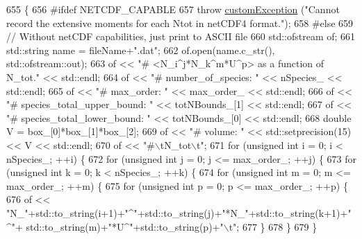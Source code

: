 \begin{DoxyCode}
655                                                                                \{
656 \textcolor{preprocessor}{#ifdef NETCDF\_CAPABLE}
657 \textcolor{preprocessor}{}    \textcolor{keywordflow}{throw} \hyperlink{classcustom_exception}{customException} (\textcolor{stringliteral}{"Cannot record the extensive moments for each Ntot in netCDF4
       format."});
658 \textcolor{preprocessor}{#else}
659 \textcolor{preprocessor}{}    \textcolor{comment}{// Without netCDF capabilities, just print to ASCII file}
660     std::ofstream of;
661     std::string name = fileName+\textcolor{stringliteral}{".dat"};
662     of.open(name.c\_str(), std::ofstream::out);
663     of << \textcolor{stringliteral}{"# <N\_i^j*N\_k^m*U^p> as a function of N\_tot."} << std::endl;
664     of << \textcolor{stringliteral}{"# number\_of\_species: "} << nSpecies\_ << std::endl;
665     of << \textcolor{stringliteral}{"# max\_order: "} << max\_order\_ << std::endl;
666     of << \textcolor{stringliteral}{"# species\_total\_upper\_bound: "} << totNBounds\_[1] << std::endl;
667     of << \textcolor{stringliteral}{"# species\_total\_lower\_bound: "} << totNBounds\_[0] << std::endl;
668     \textcolor{keywordtype}{double} V = box\_[0]*box\_[1]*box\_[2];
669     of << \textcolor{stringliteral}{"# volume: "} << std::setprecision(15) << V << std::endl;
670     of << \textcolor{stringliteral}{"#\(\backslash\)tN\_tot\(\backslash\)t"};
671     \textcolor{keywordflow}{for} (\textcolor{keywordtype}{unsigned} \textcolor{keywordtype}{int} i = 0; i < nSpecies\_; ++i) \{
672         \textcolor{keywordflow}{for} (\textcolor{keywordtype}{unsigned} \textcolor{keywordtype}{int} j = 0; j <= max\_order\_; ++j) \{
673             \textcolor{keywordflow}{for} (\textcolor{keywordtype}{unsigned} \textcolor{keywordtype}{int} k = 0; k < nSpecies\_; ++k) \{
674                 \textcolor{keywordflow}{for} (\textcolor{keywordtype}{unsigned} \textcolor{keywordtype}{int} m = 0; m <= max\_order\_; ++m) \{
675                     \textcolor{keywordflow}{for} (\textcolor{keywordtype}{unsigned} \textcolor{keywordtype}{int} p = 0; p <= max\_order\_; ++p) \{
676                         of << \textcolor{stringliteral}{"N\_"}+std::to\_string(i+1)+\textcolor{stringliteral}{"^"}+std::to\_string(j)+\textcolor{stringliteral}{"*N\_"}+std::to\_string(k+1)+\textcolor{stringliteral}{"^"}+
      std::to\_string(m)+\textcolor{stringliteral}{"*U^"}+std::to\_string(p)+\textcolor{stringliteral}{"\(\backslash\)t"};
677                     \}
678                 \}
679             \}

\end{DoxyCode}
